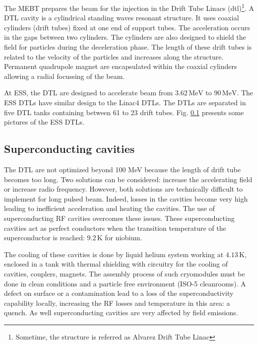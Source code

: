 \begin{refsection}
  

  The MEBT prepares the beam for the injection in the Drift Tube Linacs (\acrshort{dtl})\footnote{Sometime, the structure is referred as Alvarez Drift Tube Linac}.
  A DTL cavity is a cylindrical standing waves resonant structure. It uses coaxial cylinders (drift tubes) fixed at one end of support tubes. The acceleration occurs in the gaps between two cylinders. The cylinders are also designed to shield the field for particles during the deceleration phase. The length of these drift tubes is related to the velocity of the particles and increases along the structure. Permanent quadrupole magnet are encapsulated within the coaxial cylinders allowing a  radial focussing of the beam.

  At ESS, the DTL are designed to accelerate beam from $3.62\,\mathrm{MeV}$ to $90\,\mathrm{MeV}$. The ESS DTLs have similar design to the Linac4 DTLs. The DTLs are separated in five DTL tanks containing between 61 to 23 drift tubes. Fig. \ref{} presents some pictures of the ESS DTLs.


  \subsection{Superconducting cavities}
  The DTL are not optimized beyond 100 MeV because the length of drift tube becomes too long. Two solutions can be considered: increase the accelerating field or increase radio frequency. However, both solutions are technically difficult to implement for long pulsed beam. Indeed, losses in the cavities become very high leading to inefficient acceleration and heating the cavities. The use of superconducting RF cavities overcomes these issues. These superconducting cavities act as perfect conductors when the transition temperature of the superconductor is reached: $9.2\,\mathrm{K}$ for niobium.

  The cooling of these cavities is done by liquid helium system working at $4.13\,\mathrm{K}$, enclosed in a tank with thermal shielding with circuitry for the cooling of cavities, couplers, magnets. The assembly process of such cryomodules must be done in clean conditions and a particle free environment (ISO-5 cleanrooms). A defect on surface or a contamination lead to a loss of the superconductivity capability locally, increasing the RF losses and temperature in this area: a quench.
  As well superconducting cavities are very affected by field emissions.


\end{refsection}
